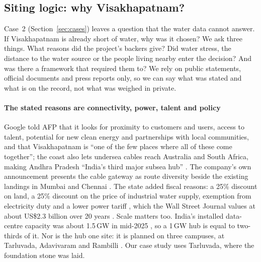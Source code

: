 \subsection{Siting logic: why Visakhapatnam?}\label{sec:siting}

Case~2 (Section~\ref{sec:cases}) leaves a question that the water data cannot answer. If Visakhapatnam is already
short of water, why was it chosen? We ask three things. What reasons did the project's backers give? Did water stress, the
distance to the water source or the people living nearby enter the decision? And was there a framework that required them
to? We rely on public statements, official documents and press reports only, so we can say what was stated and what is on
the record, not what was weighed in private.

\paragraph{The stated reasons are connectivity, power, talent and policy} Google told AFP that it looks for proximity to
customers and users, access to talent, potential for new clean energy and partnerships with local communities, and that
Visakhapatnam is ``one of the few places where all of these come together''; the coast also lets undersea cables reach
Australia and South Africa, making Andhra Pradesh ``India's third major subsea hub'' \citep{afp2026}. The
company's own announcement presents the cable gateway as route diversity beside the existing landings in Mumbai and Chennai
\citep{google2025}. The state added fiscal reasons: a 25\% discount on land, a 25\% discount on the price of industrial water
supply, exemption from electricity duty and a lower power tariff \citep{newsminute2025}, which the Wall Street Journal values at about
US\$2.3 billion over 20 years \citep{csm2026}. Scale matters too. India's installed data-centre capacity was about 1.5\,GW in
mid-2025 \citep{ceew2026}, so a 1\,GW hub is equal to two-thirds of it. Nor is the hub one site: it is planned on three
campuses, at Tarluvada, Adavivaram and Rambilli \citep{deccan2025}. Our case study uses Tarluvada, where the foundation stone was laid.

